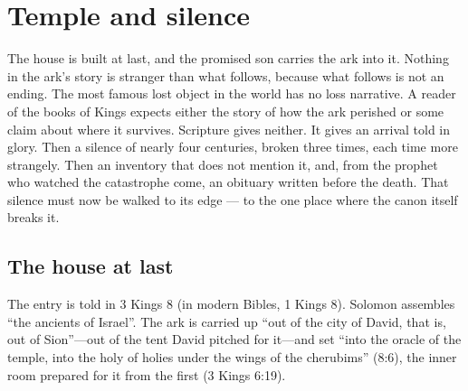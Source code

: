 \sectionguard
\section{Temple and silence}

The house is built at last, and the promised son carries the ark into it.
Nothing in the ark's story is stranger than what follows, because what
follows is not an ending. The most famous lost object in the world has no
loss narrative. A reader of the books of Kings expects either the story of
how the ark perished or some claim about where it survives. Scripture gives
neither. It gives an arrival told in glory. Then a silence of nearly four
centuries, broken three times, each time more strangely. Then an inventory
that does not mention it, and, from the prophet who watched the
catastrophe come, an obituary written before the death. That silence must
now be walked to its edge --- to the one place where the canon itself
breaks it.

\subsection{The house at last}

The entry is told in 3 Kings 8 (in modern Bibles, 1 Kings 8). Solomon
assembles ``the ancients of Israel''. The ark is carried up ``out of the city
of David, that is, out of Sion''---out of the tent David pitched for it---and
set ``into the oracle of the temple, into the holy of holies under the wings
of the cherubims'' (8:6), the inner room prepared for it from the first
(3 Kings 6:19).

